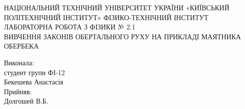 \documentclass[a4paper,12pt]{article}
\begin{document}
\begin{titlepage}
\begin{center}
\large НАЦІОНАЛЬНИЙ ТЕХНІЧНИЙ УНІВЕРСИТЕТ УКРАЇНИ «КИЇВСЬКИЙ ПОЛІТЕХНІЧНИЙ ІНСТИТУТ» ФІЗИКО-ТЕХНІЧНИЙ ІНСТИТУТ	
\newline\newline\newline\newline\newline\newline\newline\newline\newline
\LARGE{ЛАБОРАТОРНА РОБОТА З ФІЗИКИ № 2.1\\ ВИВЧЕННЯ ЗАКОНІВ ОБЕРТАЛЬНОГО РУХУ НА ПРИКЛАДІ МАЯТНИКА ОБЕРБЕКА}
\newline\newline\newline\newline\newline\newline\newline\newline\newline
\end{center}
\flushright 
Виконала:\\
студент групи  ФІ-12\\
Бекешева Анастасія \\
Прийняв:\\
Долгошей В.Б.

\end{titlepage}
\newpage
\end{document}
